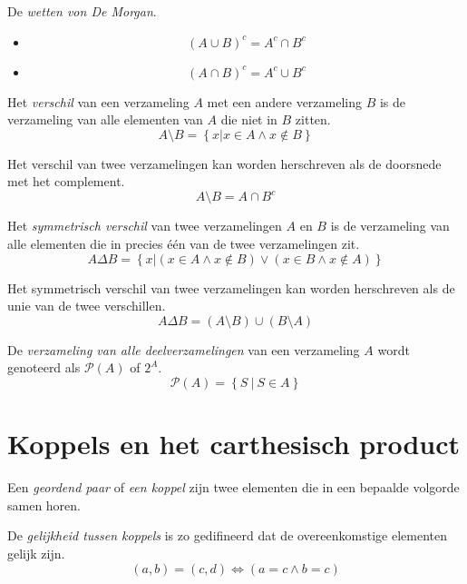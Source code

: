 \documentclass[main.tex]{subfiles}
\begin{document}
\begin{st}
  De \emph{wetten von De Morgan}.
  \begin{itemize}
  \item \[ (A \cup B)^{c} = A^{c} \cap B^{c} \]
  \item \[ (A \cap B)^{c} = A^{c} \cup B^{c} \]
  \end{itemize}
\end{st}

\begin{de}
  Het \emph{verschil} van een verzameling $A$ met een andere verzameling $B$ is de verzameling van alle elementen van $A$ die niet in $B$ zitten.
  \[ A \setminus B = \left\{ x | x \in A \wedge x \not\in B \right\} \]
\end{de}

\begin{st}
  Het verschil van twee verzamelingen kan worden herschreven als de doorsnede met het complement.
  \[ A \setminus B = A \cap B^{c} \]
\end{st}


\begin{de}
  Het \emph{symmetrisch verschil} van twee verzamelingen $A$ en $B$ is de verzameling van alle elementen die in precies \'e\'en van de twee verzamelingen zit.
  \[ A \Delta B = \left\{ x | (x \in A \wedge x \not\in B) \vee (x \in B \wedge x \not\in A) \right\} \]
\end{de}

\begin{st}
  Het symmetrisch verschil van twee verzamelingen kan worden herschreven als de unie van de twee verschillen.
  \[ A \Delta B = (A \setminus B) \cup (B \setminus A) \]
\end{st}

\begin{de}
  De \emph{verzameling van alle deelverzamelingen} van een verzameling $A$ wordt genoteerd als $\mathcal P(A)$ of $2^{A}$.
  \[ \mathcal P(A) = \left\{ S\ |\ S \in A \right\} \]
\end{de}

\section{Koppels en het carthesisch product}
\label{sec:koppels-en-het-carthesisch-product}

\begin{de}
  Een \emph{geordend paar} of \emph{een koppel} zijn twee elementen die in een bepaalde volgorde samen horen.
\end{de}

\begin{de}
  De \emph{gelijkheid tussen koppels} is zo gedifineerd dat de overeenkomstige elementen gelijk zijn.
  \[ (a,b) = (c,d) \Leftrightarrow (a = c \wedge b = c) \] 
\end{de}
\end{document}
